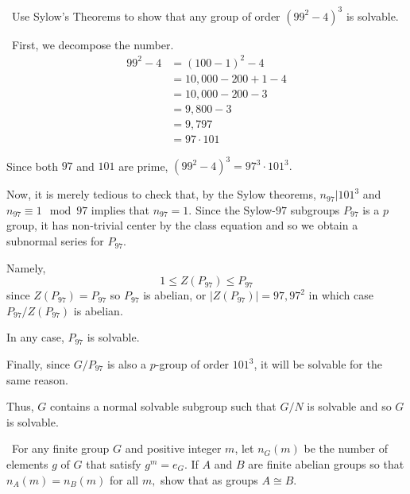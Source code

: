 \documentclass[12pt]{Qual}
\begin{document}
\begin{problem} $\,$
Use Sylow's Theorems to show that any group of order $(99^2-4)^3$ is solvable.
\end{problem}


\begin{solution}$\,$
First, we decompose the number. \begin{align*}
    99^2-4&=(100-1)^2-4\\
    &=10,000-200+1-4\\
    &=10,000-200-3\\
    &=9,800-3\\
    &=9,797\\
    &=97\cdot 101
\end{align*}

Since both $97$ and $101$ are prime, $(99^2-4)^3=97^3\cdot 101^3.$

Now, it is merely tedious to check that, by the Sylow theorems, $n_{97}|101^3$ and $n_{97}\equiv 1\mod 97$ implies that $n_{97}=1.$
Since the Sylow-$97$ subgroups $P_{97}$ is a $p$ group, it has non-trivial center by the class equation and so we obtain a subnormal series for $P_{97}.$

Namely, $$1\le Z(P_{97})\le P_{97}$$ since $Z(P_{97})=P_{97}$ so $P_{97}$ is abelian, or $|Z(P_{97})|=97,97^2$ in which case $P_{97}/Z(P_{97})$ is abelian.

In any case, $P_{97}$ is solvable.

Finally, since $G/P_{97}$ is also a $p$-group of order $101^3$, it will be solvable for the same reason.

Thus, $G$ contains a normal solvable subgroup such that $G/N$ is solvable and so $G$ is solvable.
\end{solution}
\newpage

\begin{problem} $\,$
For any finite group $G$ and positive integer $m$, let $n_G(m)$ be the number of elements $g$ of $G$ that satisfy $g^m=e_G$. If $A$ and $B$ are finite abelian groups so that $n_A(m)=n_B(m)$ for all $m,$ show that as groups $A\cong B$.
\end{problem}
\end{document}
